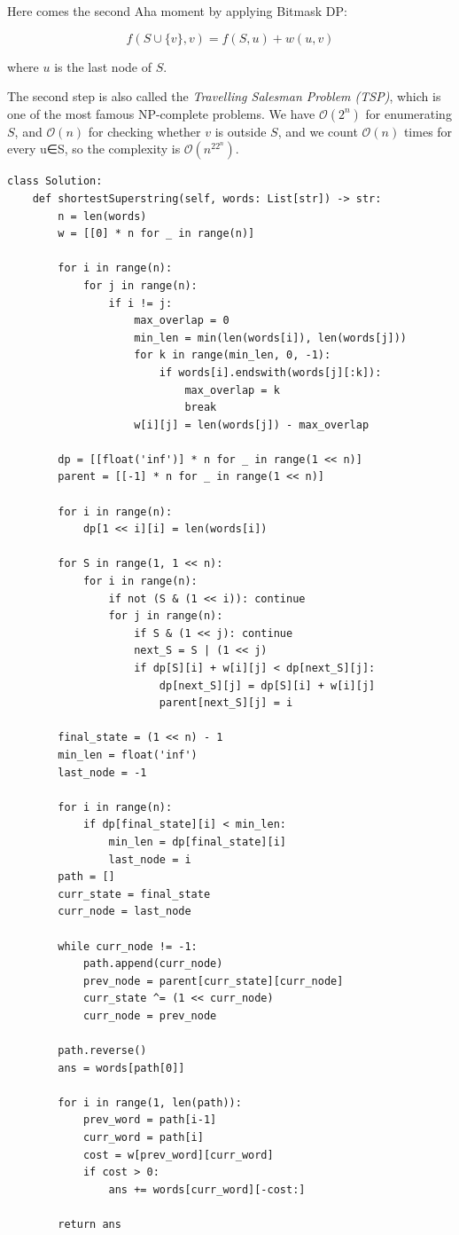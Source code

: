 \documentclass{article}
\begin{document}
Here comes the second Aha moment by applying Bitmask DP:

$$f(S \cup \{v\}, v) = f(S, u) + w(u, v)$$

where $u$ is the last node of $S$.

The second step is also called the \emph{Travelling Salesman Problem (TSP)}, which is one of the most famous NP-complete problems. We have $\mathcal O(2^n)$ for enumerating $S$, and $\mathcal O(n)$ for checking whether $v$ is outside $S$, and we count $\mathcal O(n)$ times for every u∈S, so the complexity is $\mathcal O(n^22^n)$.

\begin{lstlisting}[style=python]
class Solution:
    def shortestSuperstring(self, words: List[str]) -> str:
        n = len(words)
        w = [[0] * n for _ in range(n)]
        
        for i in range(n):
            for j in range(n):
                if i != j:
                    max_overlap = 0
                    min_len = min(len(words[i]), len(words[j]))
                    for k in range(min_len, 0, -1):
                        if words[i].endswith(words[j][:k]):
                            max_overlap = k
                            break
                    w[i][j] = len(words[j]) - max_overlap
                    
        dp = [[float('inf')] * n for _ in range(1 << n)]
        parent = [[-1] * n for _ in range(1 << n)]
        
        for i in range(n):
            dp[1 << i][i] = len(words[i])
            
        for S in range(1, 1 << n):
            for i in range(n):
                if not (S & (1 << i)): continue
                for j in range(n):
                    if S & (1 << j): continue 
                    next_S = S | (1 << j)
                    if dp[S][i] + w[i][j] < dp[next_S][j]:
                        dp[next_S][j] = dp[S][i] + w[i][j]
                        parent[next_S][j] = i
                        
        final_state = (1 << n) - 1
        min_len = float('inf')
        last_node = -1
        
        for i in range(n):
            if dp[final_state][i] < min_len:
                min_len = dp[final_state][i]
                last_node = i
        path = []
        curr_state = final_state
        curr_node = last_node
        
        while curr_node != -1:
            path.append(curr_node)
            prev_node = parent[curr_state][curr_node]
            curr_state ^= (1 << curr_node)
            curr_node = prev_node
            
        path.reverse()
        ans = words[path[0]]
        
        for i in range(1, len(path)):
            prev_word = path[i-1]
            curr_word = path[i]
            cost = w[prev_word][curr_word]
            if cost > 0:
                ans += words[curr_word][-cost:]
                
        return ans
\end{lstlisting}
\end{document}
